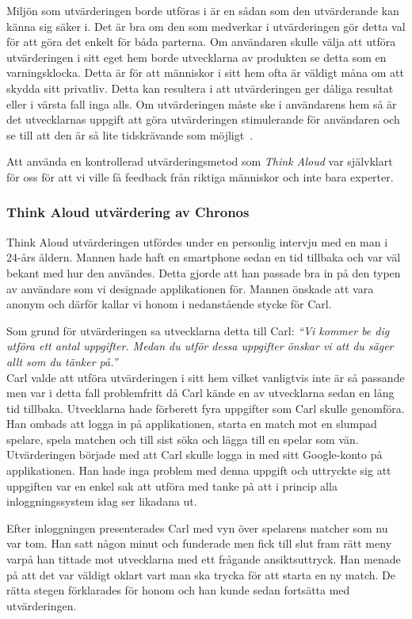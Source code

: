 \documentclass[a4paper, 11pt]{article}
\begin{document}
Miljön som utvärderingen borde utföras i är en sådan som den utvärderande kan känna sig säker i. Det är bra om den som medverkar i utvärderingen gör detta val för att göra det enkelt för båda parterna. Om användaren skulle välja att utföra utvärderingen i sitt eget hem borde utvecklarna av produkten se detta som en varningsklocka. Detta är för att människor i sitt hem ofta är väldigt måna om att skydda sitt privatliv. Detta kan resultera i att utvärderingen ger dåliga resultat eller i värsta fall inga alls. Om utvärderingen måste ske i användarens hem så är det utvecklarnas uppgift att göra utvärderingen stimulerande för användaren och se till att den är så lite tidskrävande som möjligt~\cite[sid 245]{benyon2010designing}.

Att använda en kontrollerad utvärderingsmetod som \textit{Think Aloud} var självklart för oss för att vi ville få feedback från riktiga människor och inte bara experter.

\subsubsection{Think Aloud utvärdering av Chronos}
Think Aloud utvärderingen utfördes under en personlig intervju med en man i 24-års åldern. Mannen hade haft en smartphone sedan en tid tillbaka och var väl bekant med hur den användes. Detta gjorde att han passade bra in på den typen av användare som vi designade applikationen för. Mannen önskade att vara anonym och därför kallar vi honom i nedanstående stycke för Carl.


Som grund för utvärderingen sa utvecklarna detta till Carl: \textit{``Vi kommer be dig utföra ett antal uppgifter. Medan du utför dessa uppgifter önskar vi att du säger allt som du tänker på.''}\\
Carl valde att utföra utvärderingen i sitt hem vilket vanligtvis inte är så passande men var i detta fall problemfritt då Carl kände en av utvecklarna sedan en lång tid tillbaka.
Utvecklarna hade förberett fyra uppgifter som Carl skulle genomföra. Han ombads att logga in på applikationen, starta en match mot en slumpad spelare, spela matchen och till sist söka och lägga till en spelar som vän. 
Utvärderingen började med att Carl skulle logga in med sitt Google-konto på applikationen. Han hade inga problem med denna uppgift och uttryckte sig att uppgiften var en enkel sak att utföra med tanke på att i princip alla inloggningssystem idag ser likadana ut.


Efter inloggningen presenterades Carl med vyn över spelarens matcher som nu var tom. Han satt någon minut och funderade men fick till slut fram rätt meny varpå han tittade mot utvecklarna med ett frågande ansiktsuttryck. Han menade på att det var väldigt oklart vart man ska trycka för att starta en ny match. De rätta stegen förklarades för honom och han kunde sedan fortsätta med utvärderingen.
\end{document}

